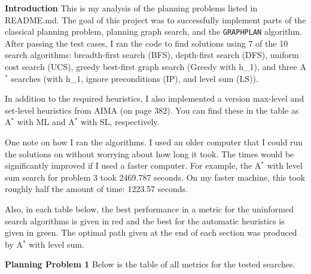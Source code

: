 \documentclass{article}
\begin{document}
{\Large \textbf{Introduction}}
\vskip1pt
This is my analysis of the planning problems listed in README.md. The goal of this project was to successfully implement parts of the classical planning problem, planning graph search, and the \texttt{GRAPHPLAN} algorithm. After passing the test cases, I ran the code to find solutions using 7 of the 10 search algorithms: breadth-first search (BFS), depth-first search (DFS), uniform cost search (UCS), greedy best-first graph search (Greedy with h\_1), and three A$^*$ searches (with h\_1, ignore preconditions (IP), and level sum (LS)).

In addition to the required heuristics, I also implemented a version max-level and set-level heuristics from AIMA (on page 382). You can find these in the table as A$^*$ with ML and A$^*$ with SL, respectively.

One note on how I ran the algorithms. I used an older computer that I could run the solutions on without worrying about how long it took. The times would be significantly improved if I used a faster computer. For example, the A$^*$ with level sum search for problem 3 took 2469.787 seconds. On my faster machine, this took roughly half the amount of time: 1223.57 seconds.

Also, in each table below, the best performance in a metric for the uninformed search algorithms is given in red and the best for the automatic heuristics is given in green. The optimal path given at the end of each section was produced by A$^*$ with level sum.

{\Large \textbf{Planning Problem 1}}
\vskip1pt
Below is the table of all metrics for the tested searches.
\end{document}
